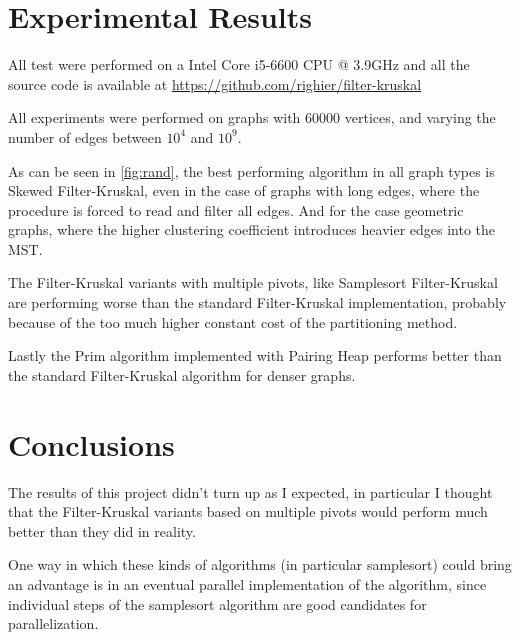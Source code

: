 \documentclass{article}
\begin{document}
\section{Experimental Results}

All test were performed on a Intel Core i5-6600 CPU @ 3.9GHz and all the source code is available at \url{https://github.com/righier/filter-kruskal}

\hspace{1cm}

All experiments were performed on graphs with 60000 vertices, and varying the number of edges between $10^4$ and $10^9$.

As can be seen in \autoref{fig:rand}, the best performing algorithm in all graph types is Skewed Filter-Kruskal, even in the case of graphs with long edges, where the procedure is forced to read and filter all edges. And for the case geometric graphs, where the higher clustering coefficient introduces heavier edges into the MST.

The Filter-Kruskal variants with multiple pivots, like Samplesort Filter-Kruskal are performing worse than the standard Filter-Kruskal implementation, probably because of the too much higher constant cost of the partitioning method.

Lastly the Prim algorithm implemented with Pairing Heap performs better than the standard Filter-Kruskal algorithm for denser graphs.

\section{Conclusions}

The results of this project didn't turn up as I expected, in particular I thought that the Filter-Kruskal variants based on multiple pivots would perform much better than they did in reality. 

One way in which these kinds of algorithms (in particular samplesort) could bring an advantage is in an eventual parallel implementation of the algorithm, since individual steps of the samplesort algorithm are good candidates for parallelization.






\end{document}
